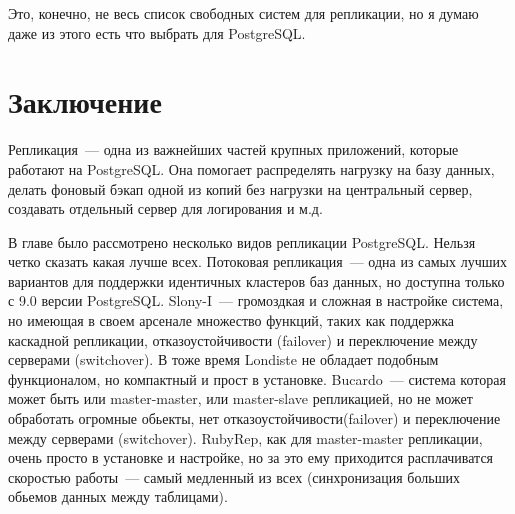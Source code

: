 Это, конечно, не весь список свободных систем для репликации, но я думаю даже из этого есть что выбрать для PostgreSQL.









\section{Заключение}
Репликация~--- одна из важнейших частей крупных приложений, которые работают на PostgreSQL. Она помогает 
распределять нагрузку на базу данных, делать фоновый бэкап одной из копий без нагрузки на центральный сервер, 
создавать отдельный сервер для логирования и м.д.

В главе было рассмотрено несколько видов репликации PostgreSQL. Нельзя четко сказать какая лучше всех. 
Потоковая репликация~--- одна из самых лучших вариантов для поддержки идентичных кластеров баз данных, 
но доступна только с 9.0 версии PostgreSQL. 
Slony-I~--- громоздкая и сложная в настройке система, 
но имеющая в своем арсенале множество функций, таких как поддержка каскадной репликации, отказоустойчивости (failover) 
и переключение между серверами (switchover). В тоже время Londiste не обладает подобным функционалом, 
но компактный и прост в установке. Bucardo~--- система которая может быть или master-master, или 
master-slave репликацией, но не может обработать огромные обьекты, нет отказоустойчивости(failover) 
и переключение между серверами (switchover). RubyRep, как для master-master репликации, 
очень просто в установке и настройке, но за это ему приходится расплачиватся скоростью работы~--- самый 
медленный из всех (синхронизация больших обьемов данных между таблицами).